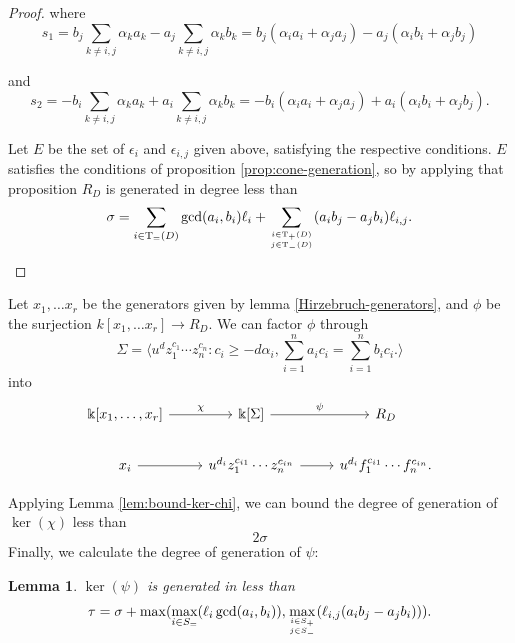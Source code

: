 \documentclass{amsart}
\theoremstyle{plain}
\newtheorem{lem}[thm]{Lemma}
\theoremstyle{definition}
\theoremstyle{remark}
\numberwithin{equation}{section}
\newcommand\bk{{\Bbbk}}
\newcommand\bida{a}
\newcommand\bidb{b}
\DeclareMathOperator{\Te}{T_=}
\DeclareMathOperator{\Tp}{T_+}
\DeclareMathOperator{\Tm}{T_-}
\begin{document}
\begin{proof}
where
\[
	s_1 = \bidb_j \sum_{k \ne i,j} \alpha_k \bida_k - \bida_j \sum_{k\ne i, j}
	\alpha_k \bidb_k = b_j (\alpha_i a_i + \alpha_j a_j) - a_j (\alpha_i b_i + \alpha_j b_j)
\]

\noindent
and
\[
	s_2 = -\bidb_i \sum_{k \ne i,j} \alpha_k \bida_k + \bida_i \sum_{k \ne i, j}
	\alpha_k \bidb_k = -b_i (\alpha_i a_i + \alpha_j a_j) + a_i (\alpha_i b_i + \alpha_j b_j).
\]

Let $E$ be the set of $\epsilon_i$ and $\epsilon_{i,j}$ given 
above, satisfying the respective conditions.
$E$ satisfies the conditions of proposition \ref{prop:cone-generation}, so by applying that proposition $R_D$ is generated in 
degree less than
\[
	\sigma = \sum_{i\in \Te(D)} \gcd(\bida_i, \bidb_i)\ell_i + \sum_{i\in \Tp(D) \atop
	j \in \Tm(D)} (\bida_i \bidb_j- \bida_j \bidb_i)\ell_{i,j}.
\]
\end{proof}

Let $x_1, \ldots x_r$ be the generators given by lemma  \ref{Hirzebruch-generators}, and $\phi$ be the surjection $k[x_1, \ldots x_r] \to R_D$.  We can factor $\phi$ through 
\[
	\Sigma =  \langle u^d z_1^{c_1} \cdots z_n^{c_n} : c_i \geq -d \alpha_i, \sum_{i=1}^{n} \bida_i c_i = \sum_{i=1}^{n} \bidb_i c_i. \rangle 
\]
into
\[
\begin{tikzcd}
\bk[x_1,\ldots, x_r] \ar {r}{\chi} & \bk[\Sigma] \ar {r}{\psi} & R_D \\
x_i \ar r & u^{d_i}z_1^{c_{i1}} \cdots z_n^{c_{in}} \ar r & u^{d_i}f_1^{c_{i1}} \cdots f_n^{c_{in}}.
\end{tikzcd}
\]

Applying Lemma \ref{lem:bound-ker-chi}, we can bound the degree of generation of $\ker(\chi)$ less than
\[
	2 \sigma
\]
Finally, we calculate the degree of generation of $\psi$:

\begin{lem}
$\ker(\psi)$ is generated in less than
\[
	\tau = \sigma
	+ \max( \max_{i\in S_=}(\ell_i \gcd(a_i, b_i)), \max_{i\in S_+ \atop j\in S_-}(\ell_{i,j} (\bida_i \bidb_j - \bida_j \bidb_i))).
\]
\end{lem}
\end{document}
